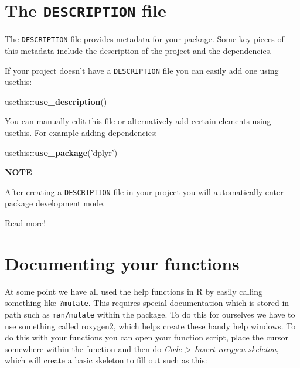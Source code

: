 \documentclass[
]{book}
\newenvironment{Shaded}{\begin{snugshade}}{\end{snugshade}}
\newcommand{\KeywordTok}[1]{\textcolor[rgb]{0.13,0.29,0.53}{\textbf{#1}}}
\newcommand{\NormalTok}[1]{#1}
\newcommand{\OperatorTok}[1]{\textcolor[rgb]{0.81,0.36,0.00}{\textbf{#1}}}
\newcommand{\StringTok}[1]{\textcolor[rgb]{0.31,0.60,0.02}{#1}}
\begin{document}
\hypertarget{desc}{%
\section{\texorpdfstring{The \texttt{DESCRIPTION} file}{The DESCRIPTION file}}\label{desc}}

The \texttt{DESCRIPTION} file provides metadata for your package. Some key pieces of this metadata include the description of the project and the dependencies.

If your project doesn't have a \texttt{DESCRIPTION} file you can easily add one using usethis:

\begin{Shaded}
\begin{Highlighting}[]
\NormalTok{usethis}\OperatorTok{::}\KeywordTok{use_description}\NormalTok{()}
\end{Highlighting}
\end{Shaded}

You can manually edit this file or alternatively add certain elements using usethis. For example adding dependencies:

\begin{Shaded}
\begin{Highlighting}[]
\NormalTok{usethis}\OperatorTok{::}\KeywordTok{use_package}\NormalTok{(}\StringTok{'dplyr'}\NormalTok{)}
\end{Highlighting}
\end{Shaded}

\textbf{NOTE}

After creating a \texttt{DESCRIPTION} file in your project you will automatically enter package development mode.

\href{https://r-pkgs.org/description.html}{Read more!}

\hypertarget{documenting-your-functions}{%
\section{Documenting your functions}\label{documenting-your-functions}}

At some point we have all used the help functions in R by easily calling something like \texttt{?mutate}. This requires special documentation which is stored in path such as \texttt{man/mutate} within the package. To do this for ourselves we have to use something called roxygen2, which helps create these handy help windows. To do this with your functions you can open your function script, place the cursor somewhere within the function and then do \emph{Code \textgreater{} Insert roxygen skeleton}, which will create a basic skeleton to fill out such as this:
\end{document}
